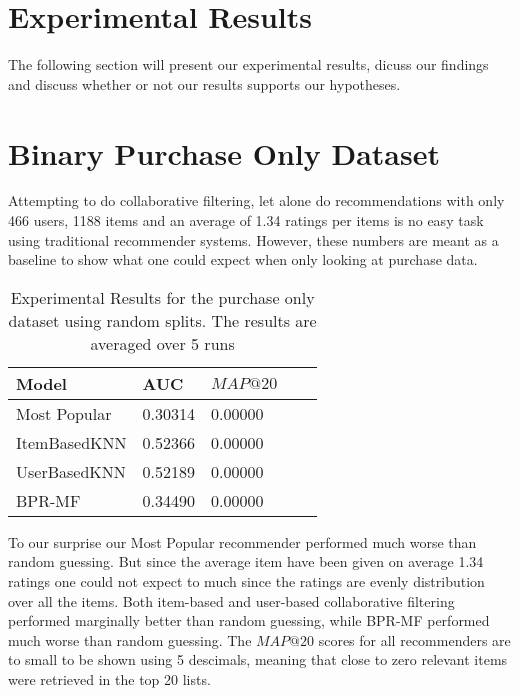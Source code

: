 
\section{Experimental Results}

The following section will present our experimental results, dicuss our findings and
discuss whether or not our results supports our hypotheses.

\section{Binary Purchase Only Dataset}

Attempting to do collaborative filtering, let alone do recommendations with only 466 users, 1188 items and
an average of 1.34 ratings per items is no easy task using traditional recommender systems. However, these numbers
are meant as a baseline to show what one could expect when only looking at purchase data.

\begin{table}[H]
    \centering
    \begin{tabular}{*{5}l}
    \toprule
    Model 			&	AUC			&	$MAP@20$ \\ \midrule
    \rowcolor{Gray}
    Most Popular	&	0.30314		&	0.00000	\\
    ItemBasedKNN	&	0.52366		&	0.00000	\\
    UserBasedKNN	&	0.52189		&	0.00000	\\
    BPR-MF			&	0.34490		&	0.00000	\\
    \bottomrule
    \end{tabular}
\caption[Experimental Results - Purchase Only Dataset]{Experimental Results for the purchase only dataset using random splits. The results are averaged over 5 runs}
\end{table}

To our surprise our Most Popular recommender performed much worse than random guessing. But since the average item
have been given on average 1.34 ratings one could not expect to much since the ratings are evenly distribution over
all the items. Both item-based and user-based collaborative filtering performed marginally better than random guessing,
while BPR-MF performed much worse than random guessing. The $MAP@20$ scores for all recommenders are to small to be shown
using 5 descimals, meaning that close to zero relevant items were retrieved in the top 20 lists.


